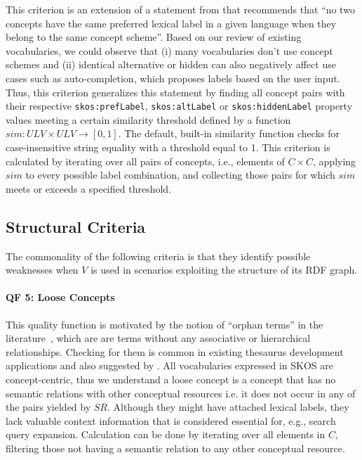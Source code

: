 This criterion is an extension of a statement from \cite{Isaac2009} that recommends that ``no two concepts have the same preferred lexical label in a given language when they belong to the same concept scheme''. Based on our review of existing vocabularies, we could observe that (i) many vocabularies don’t use concept schemes and (ii) identical alternative or hidden can also negatively affect use cases such as auto-completion, which proposes labels based on the user input. Thus, this criterion generalizes this statement by finding all concept pairs with their respective \texttt{skos:prefLabel}, \texttt{skos:altLabel} or \texttt{skos:hiddenLabel} property values meeting a certain similarity threshold defined by a function $sim:ULV \times ULV \rightarrow [0,1]$. The default, built-in similarity function checks for case-insensitive string equality with a threshold equal to 1. This criterion is calculated by iterating over all pairs of concepts, i.e., elements of $C \times C$, applying $sim$ to every possible label combination, and collecting those pairs for which $sim$ meets or exceeds a specified threshold.  


\subsection{Structural Criteria}

The commonality of the following criteria is that they identify possible weaknesses when $V$ is used in scenarios exploiting the structure of its RDF graph. 

\paragraph{\textbf{QF 5: Loose Concepts}} 

This quality function is motivated by the notion of ``orphan terms'' in the literature~\cite{Hedden2010}, which are are terms without any associative or hierarchical relationships. Checking for them is common in existing thesaurus development applications and also suggested by \cite{Z39.19:2005}. All vocabularies expressed in SKOS are concept-centric, thus we understand a loose concept is a concept that has no semantic relations with other conceptual resources i.e. it does not occur in any of the pairs yielded by $SR$. Although they might have attached lexical labels, they lack valuable context information that is considered essential for, e.g., search query expansion. Calculation can be done by iterating over all elements in $C$, filtering those not having a semantic relation to any other conceptual resource. 

